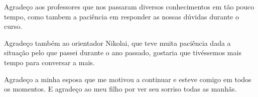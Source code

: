 \begin{agradecimentos}
	Agradeço aos professores que nos passaram diversos conhecimentos em tão pouco tempo, como tambem a paciência em responder as nossas dúvidas durante o curso. 
	
	Agradeço também ao orientador Nikolai, que teve muita paciência dada a situação pelo que passei durante o ano passado, gostaria que tivéssemos mais tempo para conversar a mais.

	Agradeço a minha esposa que me motivou a continuar e esteve comigo em todos os momentos. E agradeço ao meu filho por ver seu sorriso todas as manhãs.
\end{agradecimentos}
